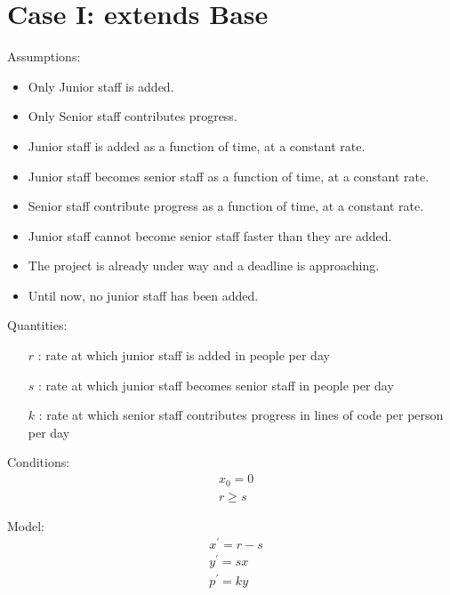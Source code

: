 \documentclass{article}
\newenvironment{atomize}
    {\begin{list} {} {
            \setlength\itemindent{0pt}
            \setlength\leftmargin{10pt}
            \setlength\labelwidth{0pt}
    }}
    {\end{list}}
\begin{document}
\section*{Case I: extends Base}
  \begin{atomize}
    \item Assumptions:
      \begin{itemize}
        \item Only Junior staff is added.
        \item Only Senior staff contributes progress.
        \item Junior staff is added as a function of time, at a constant rate.
        \item Junior staff becomes senior staff as a function of time, at a
        constant rate.
        \item Senior staff contribute progress as a function of time, at a
        constant rate.
        \item Junior staff cannot become senior staff faster than they are
        added.
        \item The project is already under way and a deadline is approaching.
        \item Until now, no junior staff has been added.
      \end{itemize}

    \item Quantities:
      \begin{itemize} 
        \item [$r$]: rate at which junior staff is added in people per day 
        \item [$s$]: rate at which junior staff becomes senior staff in people per day
        \item [$k$]: rate at which senior staff contributes progress in lines of
        code per person per day
      \end{itemize}

    \item Conditions:
      \begin{align*}
        &x_{0} = 0 \\[6pt]
        &r \geq s
      \end{align*}

    \item Model:
      \begin{align*}
        &x^{\prime} = r - s \\[6pt]
        &y^{\prime} = sx \\[6pt]
        &p^{\prime} = ky
      \end{align*}


\end{atomize}
\end{document}
